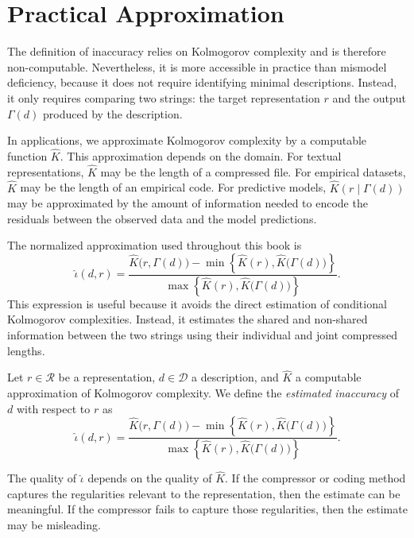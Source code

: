 %
%

\section{Practical Approximation}
\label{sec:practical_approximation_inaccuracy}

The definition of inaccuracy relies on Kolmogorov complexity and is therefore non-computable. Nevertheless, it is more accessible in practice than mismodel deficiency, because it does not require identifying minimal descriptions. Instead, it only requires comparing two strings: the target representation \(r\) and the output \(\Gamma(d)\) produced by the description.

In applications, we approximate Kolmogorov complexity by a computable function \(\widehat K\). This approximation depends on the domain. For textual representations, \(\widehat K\) may be the length of a compressed file. For empirical datasets, \(\widehat K\) may be the length of an empirical code. For predictive models, \(\widehat K(r\mid \Gamma(d))\) may be approximated by the amount of information needed to encode the residuals between the observed data and the model predictions.

The normalized approximation used throughout this book is
\[
\widehat{\iota}(d,r)
=
\frac{
\widehat K\bigl(r,\Gamma(d)\bigr)
-
\min\left\{
\widehat K(r),
\widehat K\bigl(\Gamma(d)\bigr)
\right\}
}{
\max\left\{
\widehat K(r),
\widehat K\bigl(\Gamma(d)\bigr)
\right\}
}.
\]
This expression is useful because it avoids the direct estimation of conditional Kolmogorov complexities. Instead, it estimates the shared and non-shared information between the two strings using their individual and joint compressed lengths.

\begin{definition}
\label{def:estimated_inaccuracy}
Let \(r \in \mathcal{R}\) be a representation, \(d\in\mathcal D\) a description, and \(\widehat K\) a computable approximation of Kolmogorov complexity. We define the \emph{estimated inaccuracy} of \(d\) with respect to \(r\) as
\[
\widehat{\iota}(d,r)
=
\frac{
\widehat K\bigl(r,\Gamma(d)\bigr)
-
\min\left\{
\widehat K(r),
\widehat K\bigl(\Gamma(d)\bigr)
\right\}
}{
\max\left\{
\widehat K(r),
\widehat K\bigl(\Gamma(d)\bigr)
\right\}
}.
\]
\end{definition}

The quality of \(\widehat{\iota}\) depends on the quality of \(\widehat K\). If the compressor or coding method captures the regularities relevant to the representation, then the estimate can be meaningful. If the compressor fails to capture those regularities, then the estimate may be misleading.

